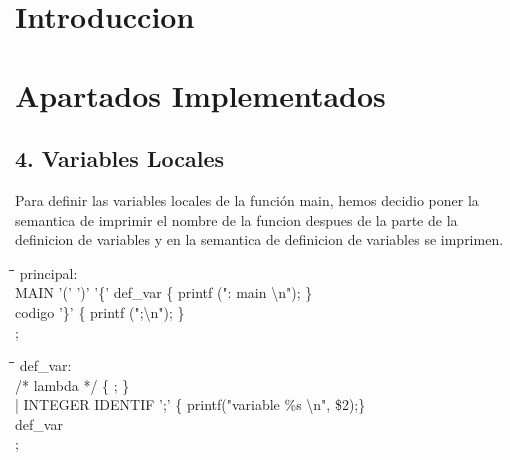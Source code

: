 \documentclass[11pt,spanish]{article}
\begin{document}
	
	
	\section{Introduccion}
	\section{Apartados Implementados}
		\subsection*{4. Variables Locales}
        Para definir las variables locales de la función main, hemos decidio poner la semantica de imprimir el nombre de la funcion despues de la parte de la definicion de variables y en la semantica de definicion de variables se imprimen.  
        \begin{tabbing}
            \hspace*{1cm}\=\hspace*{1cm}\= \hspace*{4cm}\=\kill
            principal:\\
            \> MAIN '(' ')' '\{' def\_var \>\> \{ printf (": main \textbackslash n"); \}\\
            \> \> codigo '\}'\>   \{ printf (";\textbackslash n"); \}\\
            ;
        \end{tabbing}
        \begin{tabbing}
            \hspace*{1cm}\=\hspace*{1cm}\= \hspace*{4cm}\=\kill
            def\_var:\\
            \> /* lambda */\>\>		\{ ; \}\\
            \> | INTEGER IDENTIF ';'\>\> \{ printf("variable \%s \textbackslash n", \$2);\}		\\
            \> \> def\_var\\
            ;
		\end{tabbing}
\end{document}
